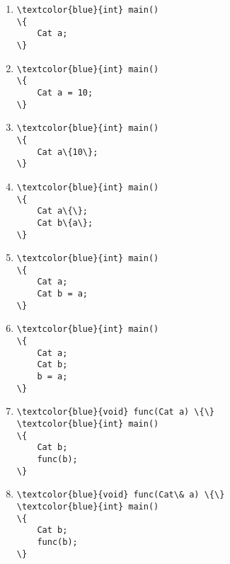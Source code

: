 \documentclass{article}
\begin{document}
\begin{enumerate}
\item \begin{Verbatim}[commandchars=\\\{\}]
\textcolor{blue}{int} main()
\{
    Cat a;
\}
\end{Verbatim}


\item \begin{Verbatim}[commandchars=\\\{\}]
\textcolor{blue}{int} main()
\{
    Cat a = 10;
\}
\end{Verbatim}

\item \begin{Verbatim}[commandchars=\\\{\}]
\textcolor{blue}{int} main()
\{
    Cat a\{10\};
\}
\end{Verbatim}

\item \begin{Verbatim}[commandchars=\\\{\}]
\textcolor{blue}{int} main()
\{
    Cat a\{\};
    Cat b\{a\};
\}
\end{Verbatim}

\item \begin{Verbatim}[commandchars=\\\{\}]
\textcolor{blue}{int} main()
\{
    Cat a;
    Cat b = a;
\}
\end{Verbatim}

\item \begin{Verbatim}[commandchars=\\\{\}]
\textcolor{blue}{int} main()
\{
    Cat a;
    Cat b;
    b = a;
\}
\end{Verbatim}

\item \begin{Verbatim}[commandchars=\\\{\}]
\textcolor{blue}{void} func(Cat a) \{\}
\textcolor{blue}{int} main()
\{
    Cat b;
    func(b);
\}
\end{Verbatim}

\item \begin{Verbatim}[commandchars=\\\{\}]
\textcolor{blue}{void} func(Cat\& a) \{\}
\textcolor{blue}{int} main()
\{
    Cat b;
    func(b);
\}
\end{Verbatim}


\end{enumerate}
\end{document}
